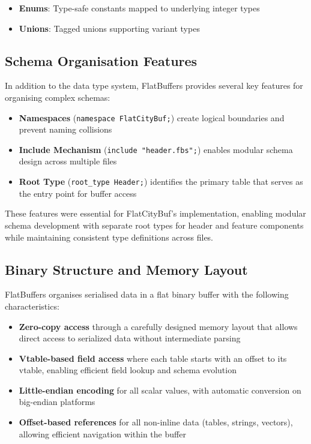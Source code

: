 \begin{itemize}
  \item \textbf{Enums}: Type-safe constants mapped to underlying integer types
  \item \textbf{Unions}: Tagged unions supporting variant types
\end{itemize}

\subsection{Schema Organisation Features}
\label{tb:flatbuffers:schema_organisation}

In addition to the data type system, FlatBuffers provides several key features for organising complex schemas:

\begin{itemize}
  \item \textbf{Namespaces} (\texttt{namespace FlatCityBuf;}) create logical boundaries and prevent naming collisions

  \item \textbf{Include Mechanism} (\texttt{include "header.fbs";}) enables modular schema design across multiple files

  \item \textbf{Root Type} (\texttt{root\_type Header;}) identifies the primary table that serves as the entry point for buffer access
\end{itemize}

These features were essential for FlatCityBuf's implementation, enabling modular schema development with separate root types for header and feature components while maintaining consistent type definitions across files.

\subsection{Binary Structure and Memory Layout}
\label{tb:flatbuffers:binary_structure}

FlatBuffers organises serialised data in a flat binary buffer with the following characteristics:

\begin{itemize}
  \item \textbf{Zero-copy access} through a carefully designed memory layout that allows direct access to serialized data without intermediate parsing
  \item \textbf{Vtable-based field access} where each table starts with an offset to its vtable, enabling efficient field lookup and schema evolution
  \item \textbf{Little-endian encoding} for all scalar values, with automatic conversion on big-endian platforms
  \item \textbf{Offset-based references} for all non-inline data (tables, strings, vectors), allowing efficient navigation within the buffer
\end{itemize}


